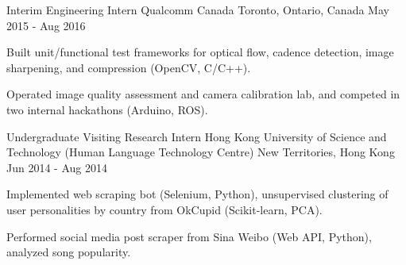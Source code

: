 \begin{cventries}
  \cventry
    {Interim Engineering Intern} %
    {Qualcomm Canada} %
    {Toronto, Ontario, Canada} %
    {May 2015 - Aug 2016} %
    {
      \begin{cvitems} %
        \item {Built unit/functional test frameworks for optical flow, cadence detection, image sharpening, and compression (OpenCV, C/C++).}
        \item {Operated image quality assessment and camera calibration lab, and competed in two internal hackathons (Arduino, ROS).}
      \end{cvitems}
    }

  \cventry
    {Undergraduate Visiting Research Intern} %
    {Hong Kong University of Science and Technology (Human Language Technology Centre)} %
    {New Territories, Hong Kong} %
    {Jun 2014 - Aug 2014} %
    {
      \begin{cvitems} %
        \item {Implemented web scraping bot (Selenium, Python), unsupervised clustering of user personalities by country from OkCupid (Scikit-learn, PCA).}
        \item {Performed social media post scraper from Sina Weibo (Web API, Python), analyzed song popularity.}
      \end{cvitems}
    }

\end{cventries}
